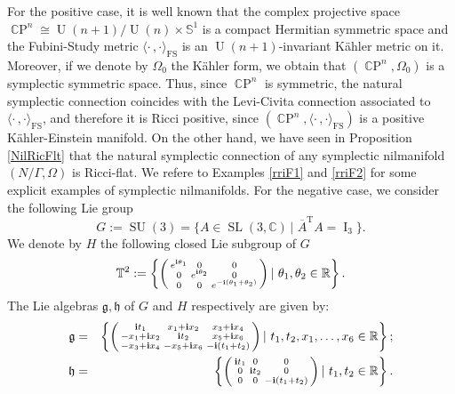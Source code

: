 \documentclass[preprint,12pt,1p]{elsarticle}
\theoremstyle{plain}
\theoremstyle{definition}
\newcommand{\met}{\langle\cdot\,,\cdot\rangle}
\newcommand{\cplx}{\mathds{C}}
\newcommand{\h}{\mathfrak{h}}
\newcommand{\SL}{\operatorname{SL}}
\newcommand{\T}{\operatorname{T}}
\numberwithin{equation}{section}
\newcommand{\U}{\operatorname{U}}
\newcommand{\I}{\operatorname{I}}
\newcommand{\SU}{\operatorname{SU}}
\begin{document}
For the positive case, it is well known that the complex projective space $\operatorname{\cplx P}^n\cong\U(n+1)/\U(n)\times\mathbb{S}^1$ is a compact Hermitian symmetric space and the Fubini-Study metric $\met_{\operatorname{FS}}$ is an $\U(n+1)$-invariant K\"ahler metric on it. Moreover, if we denote by $\Omega_0$ the K\"ahler form, we obtain that $(\operatorname{\cplx P}^n,\Omega_0)$ is a symplectic symmetric space. Thus, since $\operatorname{\cplx P}^n$ is symmetric, the natural symplectic connection coincides with the Levi-Civita connection associated to $\met_{\operatorname{FS}}$, and therefore it is Ricci positive, since $(\operatorname{\cplx P}^n,\met_{\operatorname{FS}})$ is a positive K\"ahler-Einstein manifold. On the other hand, we have seen in Proposition \ref{NilRicFlt} that the natural symplectic connection of any symplectic nilmanifold $(N/\Gamma,\Omega)$ is Ricci-flat. We refere to Examples \ref{rriF1} and \ref{rriF2} for some explicit examples of symplectic nilmanifolds. For the negative case, we consider the following Lie group
\begin{equation*}
G:=\SU(3)=\Big\{A\in\SL(3,\cplx)\,|\,\,\overline{A}^{\T}A=\I_3\Big\}.
\end{equation*}
We denote by $H$ the following closed Lie subgroup of $G$
\begin{equation*}
\mathbb{T}^2:=\left\{\begin{psmallmatrix}
e^{\mathbf{i}\theta_1}&0&0\\
0&e^{\mathbf{i}\theta_2}&0\\
0&0&e^{-\mathbf{i}(\theta_1+\theta_2)}
\end{psmallmatrix}\,|\,\,\theta_1,\theta_2\in{\mathbb{R}}\right\}.
\end{equation*}
The Lie algebras $\mathfrak{g},\mathfrak{h}$ of $G$ and $H$ respectively are given by:
\begin{eqnarray*}
\mathfrak{g}&=&\left\{\begin{psmallmatrix}
\mathbf{i}t_1&x_1+\mathbf{i}x_2&x_3+\mathbf{i}x_4\\
-x_1+\mathbf{i}x_2&\mathbf{i}t_2&x_5+\mathbf{i}x_6\\
-x_3+\mathbf{i}x_4&-x_5+\mathbf{i}x_6&-\mathbf{i}(t_1+t_2)
\end{psmallmatrix}\,|\,\,t_1,t_2,x_1,\ldots,x_6\in{\mathbb{R}}\right\};\\
\h&=&\left\{\begin{psmallmatrix}
\mathbf{i}t_1&0&0\\
0&\mathbf{i}t_2&0\\
0&0&-\mathbf{i}(t_1+t_2)
\end{psmallmatrix}\,|\,\,t_1,t_2\in{\mathbb{R}}\right\}.
\end{eqnarray*}
\end{document}
